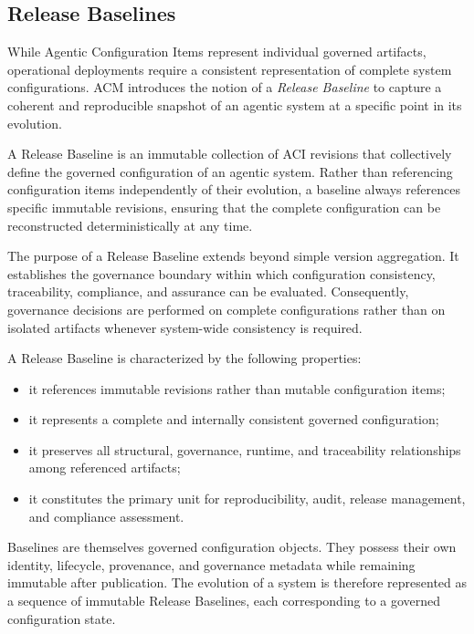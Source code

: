 \documentclass[10pt]{article}
\begin{document}
\subsection{Release Baselines}
\label{sec:release_baselines}

While Agentic Configuration Items represent individual governed artifacts, operational deployments require a consistent representation of complete system configurations. ACM introduces the notion of a \emph{Release Baseline} to capture a coherent and reproducible snapshot of an agentic system at a specific point in its evolution.

A Release Baseline is an immutable collection of ACI revisions that collectively define the governed configuration of an agentic system. Rather than referencing configuration items independently of their evolution, a baseline always references specific immutable revisions, ensuring that the complete configuration can be reconstructed deterministically at any time.

The purpose of a Release Baseline extends beyond simple version aggregation. It establishes the governance boundary within which configuration consistency, traceability, compliance, and assurance can be evaluated. Consequently, governance decisions are performed on complete configurations rather than on isolated artifacts whenever system-wide consistency is required.

A Release Baseline is characterized by the following properties:

\begin{itemize}

\item it references immutable revisions rather than mutable configuration items;

\item it represents a complete and internally consistent governed configuration;

\item it preserves all structural, governance, runtime, and traceability relationships among referenced artifacts;

\item it constitutes the primary unit for reproducibility, audit, release management, and compliance assessment.

\end{itemize}

Baselines are themselves governed configuration objects. They possess their own identity, lifecycle, provenance, and governance metadata while remaining immutable after publication. The evolution of a system is therefore represented as a sequence of immutable Release Baselines, each corresponding to a governed configuration state.
\end{document}
